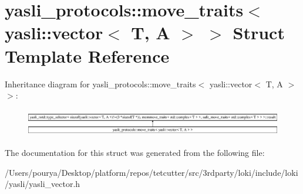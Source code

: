 \hypertarget{structyasli__protocols_1_1move__traits_3_01yasli_1_1vector_3_01T_00_01A_01_4_01_4}{}\section{yasli\+\_\+protocols\+:\+:move\+\_\+traits$<$ yasli\+:\+:vector$<$ T, A $>$ $>$ Struct Template Reference}
\label{structyasli__protocols_1_1move__traits_3_01yasli_1_1vector_3_01T_00_01A_01_4_01_4}
Inheritance diagram for yasli\+\_\+protocols\+:\+:move\+\_\+traits$<$ yasli\+:\+:vector$<$ T, A $>$ $>$\+:\begin{figure}[H]
\begin{center}
\leavevmode
\includegraphics[height=1.214751cm]{structyasli__protocols_1_1move__traits_3_01yasli_1_1vector_3_01T_00_01A_01_4_01_4}
\end{center}
\end{figure}


The documentation for this struct was generated from the following file\+:\begin{DoxyCompactItemize}
\item 
/\+Users/pourya/\+Desktop/platform/repos/tetcutter/src/3rdparty/loki/include/loki/yasli/yasli\+\_\+vector.\+h\end{DoxyCompactItemize}
